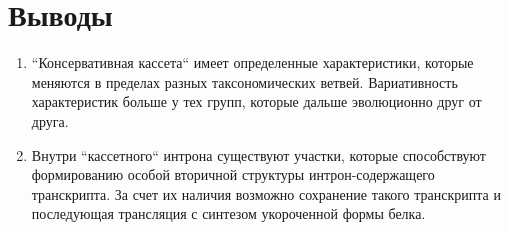 \clearpage
\section{Выводы}

\begin{enumerate}[left=\parindent]
    \item ``Консервативная кассета`` имеет определенные характеристики, которые меняются в пределах разных таксономических ветвей. Вариативность характеристик больше у тех групп, которые дальше эволюционно друг от друга.
    \item Внутри ``кассетного`` интрона существуют участки, которые способствуют формированию особой вторичной структуры интрон-содержащего транскрипта. За счет их наличия возможно сохранение такого транскрипта и последующая трансляция с синтезом укороченной формы белка.
\end{enumerate}
